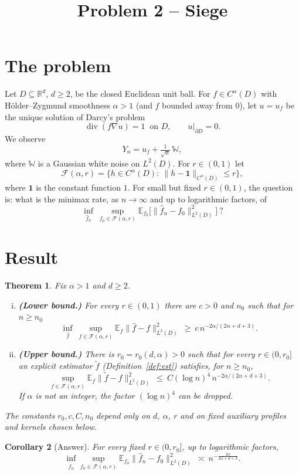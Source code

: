 \documentclass[11pt]{article}
\title{Problem 2 -- Siege}
\date{}
\author{}
\newtheorem{theorem}{Theorem}[section]
\newtheorem{corollary}[theorem]{Corollary}
\theoremstyle{definition}
\theoremstyle{remark}
\newcommand{\R}{\mathbb R}
\newcommand{\E}{\mathbb E}
\newcommand{\W}{\mathbb W}
\newcommand{\one}{\mathbf 1}
\newcommand{\Fc}{\mathcal F}
\newcommand{\dv}{\operatorname{div}}
\newcommand{\rate}{n^{-2\alpha/(2\alpha+d+3)}}
\begin{document}
\maketitle

\section{The problem}

Let $D\subseteq\R^d$, $d\ge2$, be the closed Euclidean unit ball. For $f\in C^\alpha(D)$ with H\"older--Zygmund smoothness $\alpha>1$ (and $f$ bounded away from $0$), let $u=u_f$ be the unique solution of Darcy's problem
\[
\dv(f\nabla u)=1\ \text{ on }D,\qquad u|_{\partial D}=0 .
\]
We observe
\[
Y_n=u_f+\tfrac1{\sqrt n}\,\W ,
\]
where $\W$ is a Gaussian white noise on $L^2(D)$. For $r\in(0,1)$ let
\[
\Fc(\alpha,r)=\{h\in C^\alpha(D):\ \|h-\one\|_{C^\alpha(D)}\le r\},
\]
where $\one$ is the constant function $1$. For small but fixed $r\in(0,1)$, the question is: what is the minimax rate, as $n\to\infty$ and up to logarithmic factors, of
\[
\inf_{\hat f_n}\ \sup_{f_0\in\Fc(\alpha,r)}\E_{f_0}\big[\|\hat f_n-f_0\|^2_{L^2(D)}\big]\ ?
\]

\section{Result}

\begin{theorem}\label{thm:main}
Fix $\alpha>1$ and $d\ge2$.
\begin{enumerate}[(i)]
\item \textbf{(Lower bound.)} For every $r\in(0,1)$ there are $c>0$ and $n_0$ such that for $n\ge n_0$
\[
\inf_{\hat f}\ \sup_{f\in\Fc(\alpha,r)}\E_f\|\hat f-f\|^2_{L^2(D)}\ \ge\ c\,\rate .
\]
\item \textbf{(Upper bound.)} There is $r_0=r_0(d,\alpha)>0$ such that for every $r\in(0,r_0]$ an explicit estimator $\tilde f$ (Definition~\ref{def:est}) satisfies, for $n\ge n_0$,
\[
\sup_{f\in\Fc(\alpha,r)}\E_f\|\tilde f-f\|^2_{L^2(D)}\ \le\ C(\log n)^4\,\rate .
\]
If $\alpha$ is not an integer, the factor $(\log n)^4$ can be dropped.
\end{enumerate}
The constants $r_0,c,C,n_0$ depend only on $d$, $\alpha$, $r$ and on fixed auxiliary profiles and kernels chosen below.
\end{theorem}

\begin{corollary}[Answer]
For every fixed $r\in(0,r_0]$, up to logarithmic factors,
\[
\inf_{\hat f_n}\sup_{f_0\in\Fc(\alpha,r)}\E_{f_0}\|\hat f_n-f_0\|^2_{L^2(D)}\ \asymp\ n^{-\frac{2\alpha}{2\alpha+d+3}} .
\]
\end{corollary}
\end{document}
